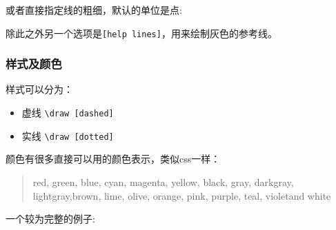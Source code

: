 \documentclass[12pt]{article}
\begin{document}
或者直接指定线的粗细，默认的单位是点:

\begin{Shaded}
\begin{Highlighting}[]
\end{Highlighting}
\end{Shaded}

除此之外另一个选项是\texttt{{[}help\ lines{]}}，用来绘制灰色的参考线。

\begin{Shaded}
\begin{Highlighting}[]
\end{Highlighting}
\end{Shaded}

\subsubsection{样式及颜色}\label{ux6837ux5f0fux53caux989cux8272}

样式可以分为：

\begin{itemize}
\tightlist
\item
  虚线 \texttt{\textbackslash{}draw\ {[}dashed{]}}
\item
  实线 \texttt{\textbackslash{}draw\ {[}dotted{]}}
\end{itemize}

颜色有很多直接可以用的颜色表示，类似css一样：

\begin{quote}
red, green, blue, cyan, magenta, yellow, black, gray, darkgray, lightgray,brown, lime, olive, orange, pink, purple, teal, violetand white
\end{quote}

一个较为完整的例子:

\begin{Shaded}
\begin{Highlighting}[]
\NormalTok{\{}\NormalTok{\}}
\NormalTok{\{}\NormalTok{\}}
\end{Highlighting}
\end{Shaded}
\end{document}
